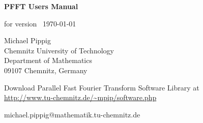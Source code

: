 \documentclass[a4paper,11pt,final,openright,headsepline]{scrreprt}
\numberwithin{figure}{chapter}
\numberwithin{table}{chapter}
\numberwithin{equation}{chapter}
\begin{document}
  \setcounter{equation}{0}

  \begin{titlepage}
    \begin{center}
      \vspace*{3cm}
      {\Huge {\textbf{\textsf{PFFT Users Manual\\}}}}

      \vspace*{1cm}
      for version \pfftversion\, \today

      \vspace*{3cm}
        Michael Pippig\\
        Chemnitz University of Technology\\
        Department of Mathematics\\
        09107 Chemnitz, Germany

      \vspace*{3cm}
      Download Parallel Fast Fourier Transform Software Library at \\
      {\large \url{http://www.tu-chemnitz.de/~mpip/software.php}}
    \end{center}
    \vfill
    michael.pippig@mathematik.tu-chemnitz.de
  \end{titlepage}

  \tableofcontents
 



  
  
\end{document}
